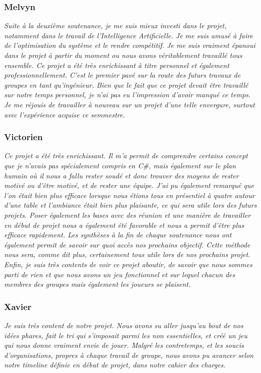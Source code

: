 \documentclass[a4paper,12pt]{article}
\newcommand{\AI}{Intelligence Artificielle}
\begin{document}
        
        \subsubsection{Melvyn}
        \textit{Suite à la deuxième soutenance, je me suis mieux investi dans le projet, notamment dans le travail de l'\AI. Je me suis amusé à faire de l'optimisation du système et le rendre compétitif. Je me suis vraiment épanoui dans le projet à partir du moment ou nous avons véritablement travaillé tous ensemble. Ce projet a été très enrichissant à titre personnel et également professionnellement. C'est le premier pavé sur la route des futurs travaux de groupes en tant qu'ingénieur. Bien que le fait que ce projet devait être travaillé sur notre temps personnel, je n'ai pas eu l'impression d'avoir manqué ce temps. Je me réjouis de travailler à nouveau sur un projet d'une telle envergure, surtout avec l'expérience acquise ce semmestre.}
        
             
        
        \subsubsection{Victorien}
             \textit{Ce projet a été très enrichissant. Il m'a permit de comprendre certains concept que je n'avais pas spécialement compris en C\#, mais également sur le plan humain où il nous a fallu rester soudé et donc trouver des moyens de rester motivé ou d'être motivé, et de rester une équipe. J'ai pu également remarqué que l'on était bien plus efficace lorsque nous étions tous en présentiel à quatre autour d'une table et l'ambiance était bien plus plaisante, ce qui sera utile lors des futurs projets. Poser également les bases avec des réunion et une manière de travailler en début de projet nous a également été favorable et nous a permit d'être plus efficace rapidement. Les synthèses à la fin de chaque soutenance nous ont également permit de savoir sur quoi accès nos prochains objectif. Cette méthode nous sera, comme dit plus, certainement tous utile lors de nos prochains projet. Enfin, je suis très contents de voir ce projet aboutir, de savoir que nous sommes parti de rien et que nous avons un jeu fonctionnel et sur lequel chacun des membres des groupes mais également les joueurs se plaisent.}
        
        \subsubsection{Xavier}
             \textit{Je suis très content de notre projet. Nous avons su aller jusqu'au bout de nos idées phares, fait le tri qui s'imposait parmi les non essentielles, et créé un jeu qui nous donne vraiment envie de jouer. Malgré les contretemps, et les soucis d'organisations, propres à chaque travail de groupe, nous avons pu avancer selon notre timeline définie en début de projet, dans notre cahier des charges.}
        
\end{document}
